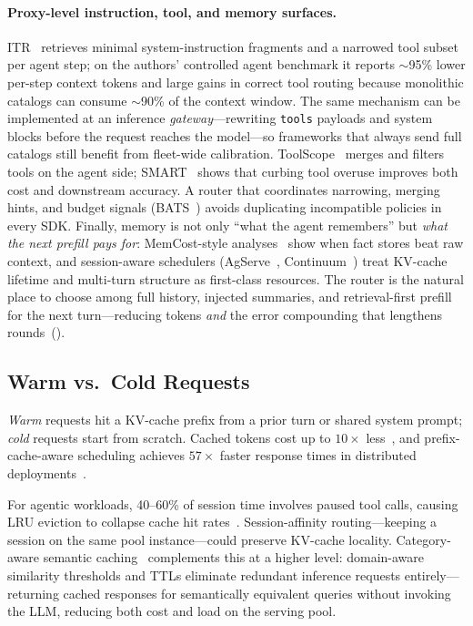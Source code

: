 \paragraph{Proxy-level instruction, tool, and memory surfaces.}
ITR~\cite{itr2026} retrieves minimal system-instruction fragments
and a narrowed tool subset per agent step; on the authors' controlled
agent benchmark it reports $\sim$95\% lower per-step context tokens
and large gains in correct tool routing because monolithic catalogs
can consume $\sim$90\% of the context window.  The same mechanism can be implemented at an
inference \emph{gateway}---rewriting \texttt{tools} payloads and
system blocks before the request reaches the model---so frameworks
that always send full catalogs still benefit from fleet-wide
calibration.  ToolScope~\cite{toolscope2025} merges and filters tools
on the agent side; SMART~\cite{smart2026} shows that curbing tool
overuse improves both cost and downstream accuracy.  A router that
coordinates narrowing, merging hints, and budget signals
(BATS~\cite{bats2025}) avoids duplicating incompatible policies in
every SDK.  Finally, memory is not only ``what the agent
remembers'' but \emph{what the next prefill pays for}: MemCost-style
analyses~\cite{memcost2026} show when fact stores beat raw context,
and session-aware schedulers (AgServe~\cite{agserve2025},
Continuum~\cite{continuum2025}) treat KV-cache lifetime and
multi-turn structure as first-class resources.  The router is the
natural place to choose among full history, injected summaries, and
retrieval-first prefill for the next turn---reducing tokens
\emph{and} the error compounding that lengthens
rounds~().

\subsection{Warm vs.\ Cold Requests}
\label{sec:workload:warm-cold}

\emph{Warm} requests hit a KV-cache prefix from a prior turn or
shared system prompt; \emph{cold} requests start from scratch.
Cached tokens cost up to $10\times$ less~\cite{llmd2026kvcache},
and prefix-cache-aware scheduling achieves $57\times$ faster
response times in distributed deployments~\cite{llmd2026kvcache}.

For agentic workloads, 40--60\% of session time involves paused tool
calls, causing LRU eviction to collapse cache hit
rates~\cite{vllm2026rfc37003}.  Session-affinity routing---keeping a
session on the same pool instance---could preserve KV-cache locality.
Category-aware semantic caching~\cite{wang2025cache} complements this
at a higher level: domain-aware similarity thresholds and TTLs
eliminate redundant inference requests entirely---returning cached
responses for semantically equivalent queries without invoking the
LLM, reducing both cost and load on the serving pool.


